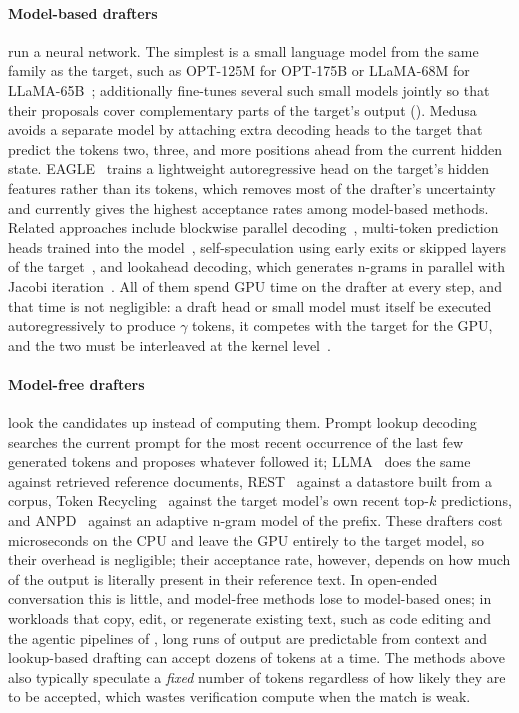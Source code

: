 \paragraph{Model-based drafters} run a neural network.
The simplest is a small language model from the same family as the target, such as OPT-125M for OPT-175B or LLaMA-68M for LLaMA-65B~\cite{leviathan2022fast,chen2023accelerating,specinfer}; \SpecInfer additionally fine-tunes several such small models jointly so that their proposals cover complementary parts of the target's output ().
Medusa~\cite{cai2024medusasimplellminference} avoids a separate model by attaching extra decoding heads to the target that predict the tokens two, three, and more positions ahead from the current hidden state.
EAGLE~\cite{li2024eagle,eagle2,li2025eagle3scalinginferenceacceleration} trains a lightweight autoregressive head on the target's hidden features rather than its tokens, which removes most of the drafter's uncertainty and currently gives the highest acceptance rates among model-based methods.
Related approaches include blockwise parallel decoding~\cite{stern2018blockwise,kim2024accelerating}, multi-token prediction heads trained into the model~\cite{gloeckle2024multitoken}, self-speculation using early exits or skipped layers of the target~\cite{draftverify,bita}, and lookahead decoding, which generates n-grams in parallel with Jacobi iteration~\cite{fu2024lookahead}.
All of them spend GPU time on the drafter at every step, and that time is not negligible: a draft head or small model must itself be executed autoregressively to produce $\gamma$ tokens, it competes with the target for the GPU, and the two must be interleaved at the kernel level~\cite{sequoia,eagle2}.

\paragraph{Model-free drafters} look the candidates up instead of computing them.
Prompt lookup decoding~\cite{saxena2023prompt} searches the current prompt for the most recent occurrence of the last few generated tokens and proposes whatever followed it; LLMA~\cite{yang2023inference} does the same against retrieved reference documents, REST~\cite{he2024rest} against a datastore built from a corpus, Token Recycling~\cite{luo2024turningtrashtreasureaccelerating} against the target model's own recent top-$k$ predictions, and ANPD~\cite{ou2024losslessaccelerationlargelanguage} against an adaptive n-gram model of the prefix.
These drafters cost microseconds on the CPU and leave the GPU entirely to the target model, so their overhead is negligible; their acceptance rate, however, depends on how much of the output is literally present in their reference text.
In open-ended conversation this is little, and model-free methods lose to model-based ones; in workloads that copy, edit, or regenerate existing text, such as code editing and the agentic pipelines of , long runs of output are predictable from context and lookup-based drafting can accept dozens of tokens at a time.
The methods above also typically speculate a \emph{fixed} number of tokens regardless of how likely they are to be accepted, which wastes verification compute when the match is weak.

